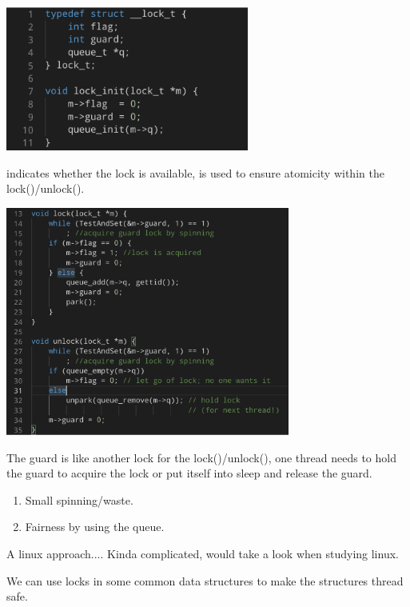     \includegraphics[width=0.6\textwidth]{chapters/Cucurrency/Cucurrency/lock_init.png}

     indicates whether the lock is available,  is used to ensure atomicity within 
    the lock()/unlock().

    \includegraphics[width=0.7\textwidth]{chapters/Cucurrency/Cucurrency/park_unpark_approach.png}

    The guard is like another lock for the lock()/unlock(), one thread needs to hold the guard to acquire the 
    lock or put itself into sleep and release the guard.

    \vspace*{2mm}

    \begin{enumerate}
        \item Small spinning/waste.
        \item Fairness by using the queue.
    \end{enumerate}


    A linux approach.... Kinda complicated, would take a look when studying linux.

    

    We can use locks in some common data structures to make the structures thread safe.


